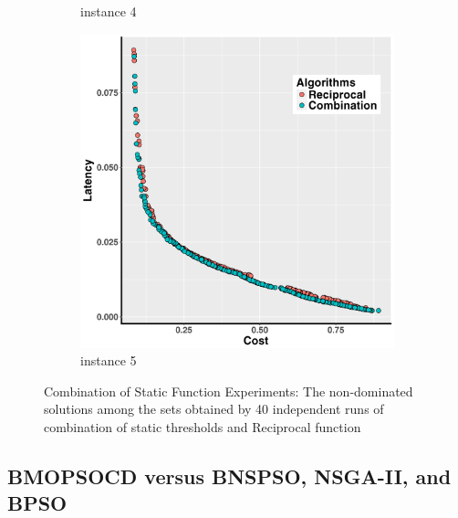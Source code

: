 \documentclass[10pt,journal,compsoc]{IEEEtran}
\begin{document}
\begin{figure}[h!]
\begin{subfigure}{0.49\linewidth}
    \caption{instance 4}
   \end{subfigure}
   \begin{subfigure}{0.49\linewidth}
       \includegraphics[width=\textwidth]{pics/combination_problem5.png}
    \caption{instance 5}
   \end{subfigure}
   \caption{Combination of Static Function Experiments:  The non-dominated solutions among
the sets obtained by 40 independent runs of combination of static thresholds and Reciprocal function}
   \label{fig:combination}
\end{figure}

\vspace{-3 mm}
\subsection{BMOPSOCD versus BNSPSO, NSGA-II, and BPSO}
\end{document}

